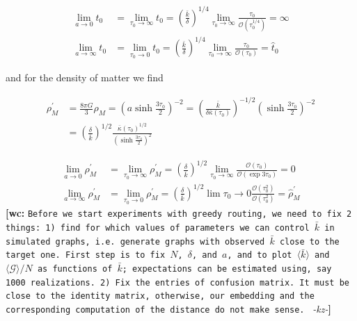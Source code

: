 \documentclass[preprint,notitlepage,amsmath,amssymb,floatfix]{revtex4-1}
\newcommand{\XXX}[3]{{\bf [#1: } {\tt #3} {\it -#2-}{\bf ]}}
\begin{document}
\begin{align}
\lim_{a\to 0} t_0 &= \lim_{\tau_0\to\infty} t_0 = \left(\frac{\bar k}{\delta}\right)^{1/4}\lim_{\tau_0\to\infty}\frac{\tau_0}{\mathcal{O}\left(\tau_0^{1/4}\right)} = \infty \\
\lim_{a\to\infty} t_0 &= \lim_{\tau_0\to 0} t_0 = \left(\frac{\bar k}{\delta}\right)^{1/4}\lim_{\tau_0\to\infty}\frac{\tau_0}{\mathcal{O}\left(\tau_0\right)} = \hat{t}_0
\end{align}

\noindent and for the density of matter we find

\begin{equation}
\begin{split}
\rho_M^\prime &= \frac{8\pi G}{3}\rho_M = \left(a\sinh\frac{3\tau_0}{2}\right)^{-2} = \left(\frac{\bar k}{\delta\bar\kappa\left(\tau_0\right)}\right)^{-1/2}\left(\sinh\frac{3\tau_0}{2}\right)^{-2} \\
&= \left(\frac{\delta}{\bar k}\right)^{1/2}\frac{\bar\kappa\left(\tau_0\right)^{1/2}}{\left(\sinh\frac{3\tau_0}{2}\right)^2}
\end{split}
\end{equation}

\begin{align}
\lim_{a\to 0}\rho_M^\prime &= \lim_{\tau_0\to\infty}\rho_M^\prime = \left(\frac{\delta}{\bar k}\right)^{1/2}\lim_{\tau_0\to\infty}\frac{\mathcal{O}\left(\tau_0\right)}{\mathcal{O}\left(\exp{3\tau_0}\right)} = 0 \\
\lim_{a\to\infty}\rho_M^\prime &= \lim_{\tau_0\to 0}\rho_M^\prime = \left(\frac{\delta}{\bar k}\right)^{1/2}\lim{\tau_0\to 0}\frac{\mathcal{O}\left(\tau_0^2\right)}{\mathcal{O}\left(\tau_0^2\right)} = \hat{\rho}_M^\prime
\end{align}
\XXX{wc}{kz}{Before we start experiments with greedy routing, we need to fix 2 things: 1) find for which values of parameters we can control $\bar{k}$ in simulated graphs, i.e. generate graphs with observed $\bar{k}$ close to the target one. First step is to fix $N$, $\delta$, and $a$, and to plot $\langle\bar{k}\rangle$ and $\langle\mathcal{G}\rangle/N$ as functions of $\bar{k}$; expectations can be estimated using, say 1000 realizations. 2) Fix the entries of confusion matrix. It must be close to the identity matrix, otherwise, our embedding and the corresponding computation of the distance do not make sense.   }
\end{document}
